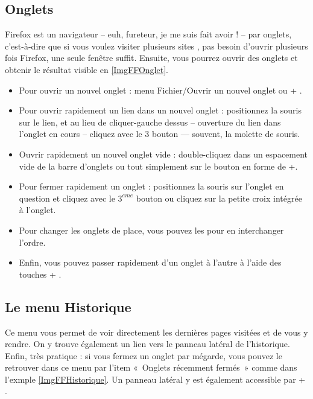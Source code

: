 \subsection{Onglets}
\label{RefFFOnglets}
Firefox est un navigateur -- euh, fureteur, je me suis fait avoir ! --  par onglets, c'est-à-dire que si vous voulez visiter plusieurs sites , pas besoin d'ouvrir plusieurs fois Firefox, une seule fenêtre suffit. Ensuite, vous pourrez ouvrir des onglets et obtenir le résultat visible en \ref{ImgFFOnglet}.\par
{}
\begin{itemize}
\item Pour ouvrir un nouvel onglet : menu Fichier/Ouvrir un nouvel onglet ou  + .
\item Pour ouvrir rapidement un lien dans un nouvel onglet : positionnez la souris sur le lien, et au lieu de cliquer-gauche dessus -- ouverture du lien dans l'onglet en cours -- cliquez avec le 3\ieme{} bouton --- souvent, la molette de souris.
\item Ouvrir rapidement un nouvel onglet vide : double-cliquez dans un espacement vide de la barre d'onglets ou tout simplement sur le bouton en forme de +.
\item Pour fermer rapidement un onglet : positionnez la souris sur l'onglet en question et cliquez avec le $3^{eme}$ bouton ou cliquez sur la petite croix intégrée à l'onglet.
\item Pour changer les onglets de place, vous pouvez les  pour en interchanger l'ordre.
\item Enfin, vous pouvez passer rapidement d'un onglet à l'autre à l'aide des touches  + .
\end{itemize}
\subsection{Le menu Historique}
Ce menu vous permet de voir directement les dernières pages visitées et de vous y rendre. On y trouve également un lien vers le panneau latéral de l'historique. Enfin, très pratique : si vous fermez un onglet par mégarde, vous pouvez le retrouver dans ce menu par l'item «~Onglets récemment fermés~» comme dans l'exmple \ref{ImgFFHistorique}. Un panneau latéral y est également accessible par  + .
